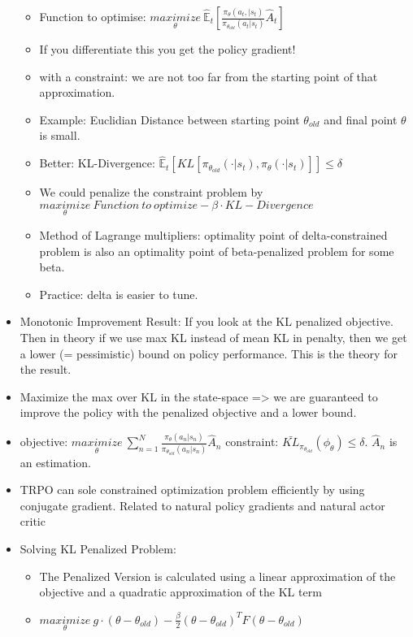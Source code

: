 \begin{itemize}[noitemsep,nolistsep]
\begin{itemize}[noitemsep,nolistsep]
		\item Function to optimise: $\underset{\theta}{maximize}\ \hat{\mathbb{E}}_t [\frac{\pi_\theta (a_t, | s_t)}{\pi_{\theta_{old}}(a_t | s_t)} \hat{A}_t]$
		\item If you differentiate this you get the policy gradient!
		\item with a constraint: we are not too far from the starting point of that approximation.
		\item Example: Euclidian Distance between starting point $\theta_{old}$ and final point $\theta$ is small.
		\item Better: KL-Divergence: $\hat{\mathbb{E}}_t [KL[\pi_{\theta_{old}}(\cdot|s_t),\pi_{\theta}(\cdot|s_t)]] \leq \delta$
		\item We could penalize the constraint problem by $\underset{\theta}{maximize}\ Function\ to\ optimize - \beta \cdot KL-Divergence$
		\item Method of Lagrange multipliers: optimality point of delta-constrained problem is also an optimality point of beta-penalized problem for some beta.
		\item Practice: delta is easier to tune.
	\end{itemize}
	\item Monotonic Improvement Result: If you look at the KL penalized objective. Then in theory if we use max KL instead of mean KL in penalty, then we get a lower (= pessimistic) bound on policy performance. This is the theory for the result.
	\item Maximize the max over KL in the state-space => we are guaranteed to improve the policy with the penalized objective and a lower bound.
	\item objective: $\underset{\theta}{maximize}\ \sum_{n=1}^N \frac{\pi_\theta (a_n | s_n)}{\pi_{\theta_{old}}(a_n | s_n)} \hat{A}_n$ constraint: $\bar{KL}_{\pi_{\theta_{old}}}(\phi_{\theta}) \leq \delta$. $\hat{A}_n$ is an estimation.
	\item TRPO can sole constrained optimization problem efficiently by using conjugate gradient. Related to natural policy gradients and natural actor critic
	\item Solving KL Penalized Problem:
	\begin{itemize}[noitemsep,nolistsep]
		\item The Penalized Version is calculated using a linear approximation of the objective and a quadratic approximation of the KL term
		\item $\underset{\theta}{maximize}\ g \cdot (\theta - \theta_{old}) - \frac{\beta}{2}(\theta - \theta_{old})^T F(\theta - \theta_{old})$

\end{itemize}
\end{itemize}
